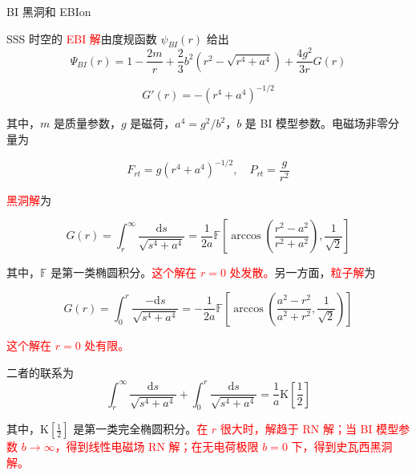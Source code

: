 \documentclass[9pt, dvipsnames]{beamer} %
\begin{document}
\begin{frame}{BI 黑洞和 EBIon}

    SSS 时空的 \textcolor{red}{EBI 解}由度规函数 $\psi_{BI}(r)$ 给出
$$
\Psi_{BI}(r)
=1-\frac{2m }{r } + \frac{2 }{3 } b^2\left(r^2-\sqrt{r^4+a^4} \right) + \frac{4g^2 }{3r } G(r)
$$

$$
G'(r)
=-\left(r^4+a^4 \right)^{-1/2}
$$

其中，$m$ 是质量参数，$g$ 是磁荷，$a^4=g^2/b^2$，$b$ 是 BI 模型参数。电磁场非零分量为

$$
F_{rt}
=g\left(r^4+a^4 \right)^{-1/2},\quad
P_{rt}
=\frac{g }{r^2 }
$$

\textcolor{red}{黑洞解}为

$$
G(r)
=\int_{r}^{\infty} \frac{\mathrm{d}s }{\sqrt{s^4+a^4} } 
=\frac{1 }{2a } \mathbb{F} \left[\arccos\left(\frac{r^2-a^2 }{r^2+a^2 }  \right) , \frac{1 }{\sqrt{2} }  \right]
$$

其中，$\mathbb{F}$ 是第一类椭圆积分。\textcolor{red}{这个解在 $r=0$ 处发散。}另一方面，\textcolor{red}{粒子解}为

$$
G(r)
=\int_{0}^{r} \frac{-\mathrm{d}s }{\sqrt{s^4+a^4} } 
=-\frac{1 }{2a } \mathbb{F}\left[\arccos\left(\frac{a^2-r^2 }{a^2+r^2 } , \frac{1 }{\sqrt{2} }  \right) \right]
$$

\textcolor{red}{这个解在 $r=0$ 处有限。}

\end{frame}

\begin{frame}
    二者的联系为
$$
\int_r ^{\infty} \frac{\mathrm{d}s }{\sqrt{s^4+a^4} } + \int_0^r \frac{\mathrm{d}s }{\sqrt{s^4+a^4} } 
=\frac{1 }{a } \mathrm{K}\left[\frac{1 }{2 }  \right] 
$$

其中，$\mathrm{K}\left[\frac{1 }{2 } \right]$ 是第一类完全椭圆积分。\textcolor{red}{在 $r$ 很大时，解趋于 RN 解；当 BI 模型参数 $b\to\infty$，得到线性电磁场 RN 解；在无电荷极限 $b=0$ 下，得到史瓦西黑洞解。}

\end{frame}
\end{document}
